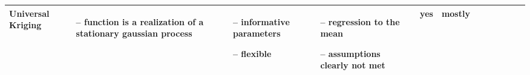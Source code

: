 \begin{table}[!ht]
\begin{tabular}{p{1.6cm}p{3.3cm}p{3.3cm}p{3.3cm}p{0.4cm}p{0.4cm}p{3cm}p{3cm}p{3cm}p{3cm}p{3cm}p{3cm}|}
		Universal Kriging                                                                                                                                            &
		\begin{cptitemize} \item[--]  function is a realization of a stationary gaussian process                                      \end{cptitemize}               &
		\begin{cptitemize} \item[--]  informative parameters \item[--]  flexible                                                             \end{cptitemize}        &
		\begin{cptitemize} \item[--]  regression to the mean \item[--]  assumptions clearly not met                                          \end{cptitemize}        &
		yes                                                                                                                                                          &
		mostly                                                                                                                                                         \\ \hline%


		\hline
	\end{tabular}
	\label{table:pros_cons_overview}
\end{table}
